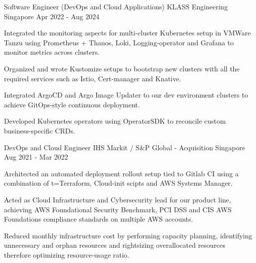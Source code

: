 

\begin{cventries}

  \cventry
    {Software Engineer (DevOps and Cloud Applications)} %
    {KLASS Engineering} %
    {Singapore} %
    {Apr 2022 - Aug 2024} %
    {
      \begin{cvitems} %
        \item {Integrated the monitoring aspects for multi-cluster Kubernetes setup in VMWare Tanzu using Prometheus + Thanos, Loki, Logging-operator and Grafana to monitor metrics across clusters.}
        \item {Organized and wrote Kustomize setups to bootstrap new clusters with all the required services such as Istio, Cert-manager and Knative.}
        \item {Integrated ArgoCD and Argo Image Updater to our dev environment clusters to achieve GitOps-style continuous deployment.}
        \item {Developed Kubernetes operators using OperatorSDK to reconcile custom business-specific CRDs.}
      \end{cvitems}
    }

  \cventry
    {DevOps and Cloud Engineer} %
    {IHS Markit / S\&P Global - Acquisition} %
    {Singapore} %
    {Aug 2021 - Mar 2022} %
    {
      \begin{cvitems} %
        \item {Architected an automated deployment rollout setup tied to Gitlab CI using a combination of t=Terraform, Cloud-init scipts and AWS Systems Manager.}
        \item {Acted as Cloud Infrastructure and Cybersecurity lead for our product line, achieving AWS Foundational Security Benchmark, PCI DSS and CIS AWS Foundations compliance standards on multiple AWS accounts.}
        \item {Reduced monthly infrastructure cost by performing capacity planning, identifying unnecessary and orphan resources and rightsizing overallocated resources therefore optimizing resource-usage ratio.}
      \end{cvitems}
    }


\end{cventries}
